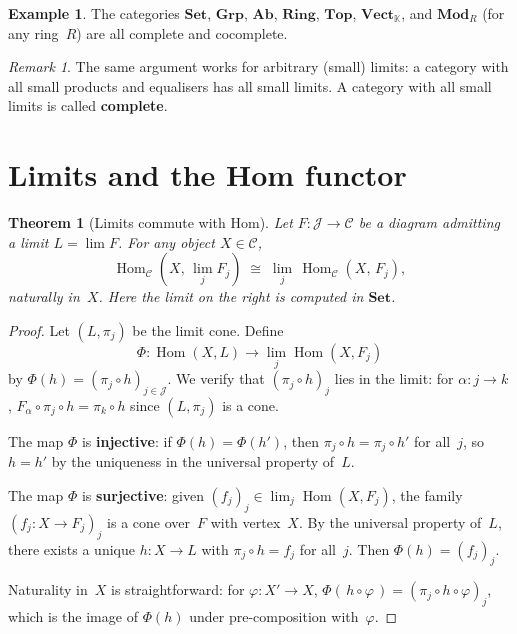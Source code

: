 \documentclass[a4paper,12pt]{book}
\DeclareMathOperator{\Hom}{Hom}
\newcommand{\Set}{\mathbf{Set}}
\newcommand{\Grp}{\mathbf{Grp}}
\newcommand{\Ab}{\mathbf{Ab}}
\newcommand{\Ring}{\mathbf{Ring}}
\newcommand{\Top}{\mathbf{Top}}
\newcommand{\Vect}{\mathbf{Vect}}
\newcommand{\Mod}{\mathbf{Mod}}
\newcommand{\K}{\mathbb{K}}
\theoremstyle{definition}
\newtheorem{example}[definition]{Example}
\theoremstyle{plain}
\newtheorem{theorem}[definition]{Theorem}
\theoremstyle{remark}
\newtheorem{remark}[definition]{Remark}
\begin{document}
\begin{example}\label{ex:complete-categories}
The categories $\Set$, $\Grp$, $\Ab$, $\Ring$, $\Top$, $\Vect_\K$,
and $\Mod_R$ (for any ring~$R$) are all complete and cocomplete.
\end{example}

\begin{remark}\label{rem:limits-general}
The same argument works for arbitrary (small) limits: a category
with all small products and equalisers has all small limits.
A category with all small limits is called \textbf{complete}.
\end{remark}


\section{Limits and the Hom functor}\label{sec:limits-hom}

\begin{theorem}[Limits commute with Hom]\label{thm:lim-hom}
Let $F\colon\mathcal{J}\to\mathcal{C}$ be a diagram admitting a limit
$L = \lim F$.  For any object $X\in\mathcal{C}$,
\[
    \Hom_{\mathcal{C}}(X,\,\lim_{j} F_j)
    \;\cong\;
    \lim_{j}\, \Hom_{\mathcal{C}}(X,\,F_j),
\]
naturally in~$X$.  Here the limit on the right is computed in $\Set$.
\end{theorem}

\begin{proof}
Let $(L,\pi_j)$ be the limit cone.  Define
\[
    \Phi\colon \Hom(X,L) \longrightarrow \lim_j\Hom(X,F_j)
\]
by $\Phi(h) = (\pi_j\circ h)_{j\in\mathcal{J}}$.  We verify that
$(\pi_j\circ h)_j$ lies in the limit: for $\alpha\colon j\to k$,
$F_\alpha\circ\pi_j\circ h = \pi_k\circ h$ since $(L,\pi_j)$ is a cone.

The map $\Phi$ is \textbf{injective}: if $\Phi(h)=\Phi(h')$,
then $\pi_j\circ h = \pi_j\circ h'$ for all~$j$, so $h = h'$
by the uniqueness in the universal property of~$L$.

The map $\Phi$ is \textbf{surjective}: given
$(f_j)_j\in\lim_j\Hom(X,F_j)$, the family $(f_j\colon X\to F_j)_j$
is a cone over~$F$ with vertex~$X$.
By the universal property of~$L$, there exists a unique
$h\colon X\to L$ with $\pi_j\circ h = f_j$ for all~$j$.
Then $\Phi(h) = (f_j)_j$.

Naturality in~$X$ is straightforward: for $\varphi\colon X'\to X$,
$\Phi(\,h\circ\varphi\,) = (\pi_j\circ h\circ\varphi)_j$,
which is the image of $\Phi(h)$ under pre-composition with~$\varphi$.
\end{proof}
\end{document}
